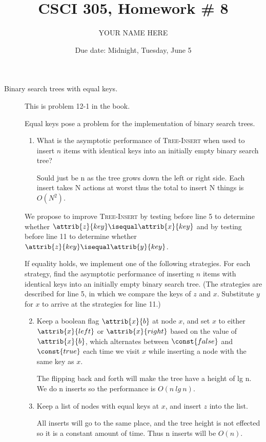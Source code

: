 \documentclass{article}
\title{CSCI 305, Homework \# 8}
\author{YOUR NAME HERE}
\date{Due date:  Midnight, Tuesday, June 5}
\begin{document}
\maketitle

\begin{description}
\item[Binary search trees with equal keys.]  This is problem 12-1
  in the book.

  Equal keys pose a problem for the implementation of binary
  search trees.
  \begin{enumerate}
  \item What is the asymptotic performance of \textsc{Tree-Insert} when
    used to insert $n$ items with identical keys into an initially empty
    binary search tree?

    Sould just be n as the tree grows down the left or right side. Each insert takes N actions at worst thus the total to insert N things is $O(N^2)$.

  \end{enumerate}
  We propose to improve \textsc{Tree-Insert} by testing before line 5
  to determine whether $\attrib{z}{key} \isequal\attrib{x}{key}$ 
  and by testing before line 11 to determine whether
  $\attrib{z}{key} \isequal\attrib{y}{key}$.

  If equality holds, we
  implement one of the following strategies.  For each strategy, find
  the asymptotic performance of inserting $n$ items with identical
  keys into an initially empty binary search tree.  (The strategies
  are described for line 5, in which we compare the keys of $z$ and
  $x$.  Substitute $y$ for $x$ to arrive at the strategies for line
  11.) 
  \begin{enumerate}\setcounter{enumi}{1}
  \item Keep a boolean flag $\attrib{x}{b}$ at node $x$, and set $x$
    to either $\attrib{x}{left}$ or $\attrib{x}{right}$ based on the
    value of $\attrib{x}{b}$, which alternates between $\const{false}$
    and $\const{true}$ each time we visit $x$ while inserting a node
    with the same key as $x$. 

    The flipping back and forth will make the tree have a height of lg n. We do n inserts so the performance is $O(n\ lg\ n)$.
\item Keep a list of nodes with equal keys at $x$, and insert $z$ into
  the list.

  All inserts will go to the same place, and the tree height is not effected so it is a constant amount of time. Thus n inserts will be $O(n)$.


\end{enumerate}
\end{description}
\end{document}
